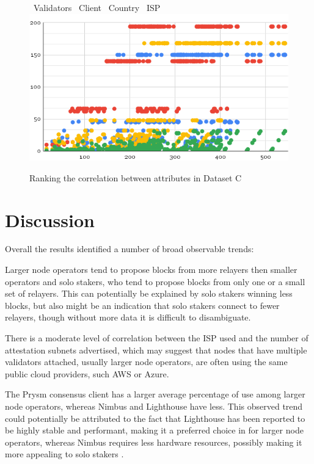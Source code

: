 \documentclass[conference]{IEEEtran}
\begin{document}
\begin{figure}[hbp]
    \centering
    \LARGE \textcolor{bluebullet}\textbullet\ \normalsize Validators %
    \LARGE \textcolor{redbullet}\textbullet\ \normalsize Client %
    \LARGE \textcolor{yellowbullet}\textbullet\ \normalsize Country %
    \LARGE \textcolor{greenbullet}\textbullet\ \normalsize ISP
    \includegraphics[width=1\linewidth]{figures/chart-3.png}
    \caption{Ranking the correlation between attributes in Dataset C}
    \label{fig:attribute-correlation-ranking-dataset-c}
\end{figure}

\section{Discussion}
\label{sec:discussion}

Overall the results identified a number of broad observable trends:

Larger node operators tend to propose blocks from more relayers then smaller operators and solo stakers, who tend to propose blocks from only one or a small set of relayers.  This can potentially be explained by solo stakers winning less blocks, but also might be an indication that solo stakers connect to fewer relayers, though without more data it is difficult to disambiguate.

There is a moderate level of correlation between the ISP used and the number of attestation subnets advertised, which may suggest that nodes that have multiple validators attached, usually larger node operators, are often using the same public cloud providers, such AWS or Azure.

The Prysm consensus client has a larger average percentage of use among larger node operators, whereas Nimbus and Lighthouse have less. This observed trend could potentially be attributed to the fact that Lighthouse has been reported to be highly stable and performant, making it a preferred choice in for larger node operators, whereas Nimbus requires less hardware resources, possibly making it more appealing to solo stakers \cite{ranjan2023}.
\end{document}
